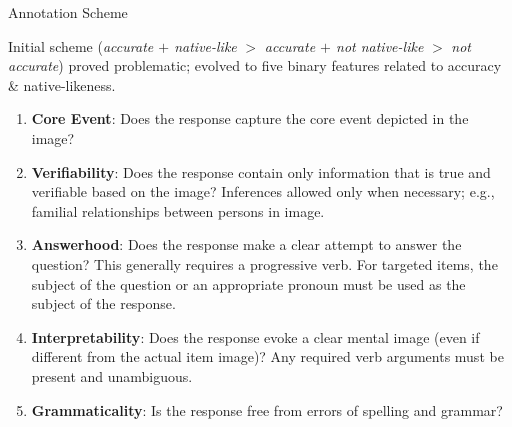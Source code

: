 \documentclass[final,t]{beamer}
\begin{document}
\begin{frame}{}
\begin{columns}[t]
\begin{column}{.33\linewidth}
\begin{block}{Annotation Scheme}
\begin{center}
\begin{minipage}{.85\textwidth}
Initial scheme (\textit{accurate $+$ native-like} $>$ \textit{accurate $+$ not native-like} $>$ \textit{not accurate}) proved problematic; evolved to five binary features related to accuracy \& native-likeness.
\vspace{.5em}
\begin{enumerate}
\item \textbf{Core Event}: Does the response capture the core event depicted in the image?
\vspace{.5em}
\item \textbf{Verifiability}: Does the response contain only information that is true and verifiable based on the image? Inferences allowed only when necessary; e.g., familial relationships between persons in image. 
\vspace{.5em}
\item \textbf{Answerhood}: Does the response make a clear attempt to answer the question? This generally requires a progressive verb. For targeted items, the subject of the question or an appropriate pronoun must be used as the subject of the response.
\vspace{.5em}
\item \textbf{Interpretability}: Does the response evoke a clear mental image (even if different from the actual item image)? Any required verb arguments must be present and unambiguous.
\vspace{.5em}
\item \textbf{Grammaticality}: Is the response free from errors of spelling and grammar?  


\end{enumerate}
\end{minipage}
\end{center}
\end{block}
\end{column}
\end{columns}
\end{frame}
\end{document}
